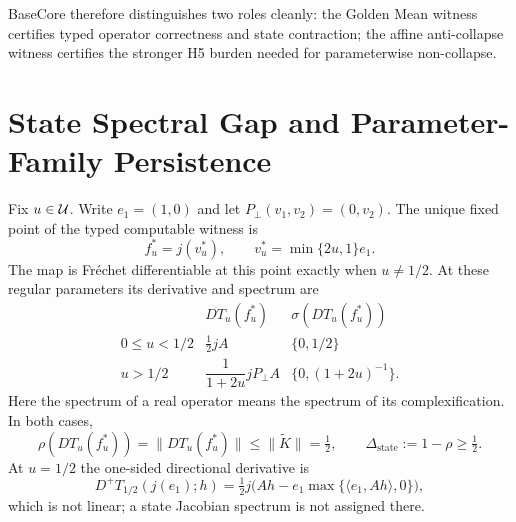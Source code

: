 \begin{remark}
BaseCore therefore distinguishes two roles cleanly: the Golden Mean witness certifies typed operator correctness and state contraction; the affine anti-collapse witness certifies the stronger H5 burden needed for parameterwise non-collapse.
\end{remark}

\section{State Spectral Gap and Parameter-Family Persistence}

\begin{theorem}\label{thm:spectrum}
Fix $u\in\mathcal{U}$. Write $e_1=(1,0)$ and let $P_\perp(v_1,v_2)=(0,v_2)$.
The unique fixed point of the typed computable witness is
\[
 f_u^*=j(v_u^*),\qquad v_u^*=\min\{2u,1\}e_1.
\]
The map is Fr\'echet differentiable at this point exactly when $u\ne1/2$.
At these regular parameters its derivative and spectrum are
\[
\begin{array}{c|c|c}
 &DT_u(f_u^*)&\sigma(DT_u(f_u^*))\\ \hline
0\le u<1/2&\tfrac12 jA&\{0,1/2\}\\[2pt]
u>1/2&\dfrac{1}{1+2u}jP_\perp A&\{0,(1+2u)^{-1}\}.
\end{array}
\]
Here the spectrum of a real operator means the spectrum of its complexification.
In both cases,
\[
 \rho(DT_u(f_u^*))=\|DT_u(f_u^*)\|
 \leq\|\widetilde K\|=\tfrac12,
 \qquad \Delta_{\mathrm{state}}:=1-\rho\geq\tfrac12.
\]
At $u=1/2$ the one-sided directional derivative is
\[
 D^+T_{1/2}(j(e_1);h)
 =\tfrac12j\bigl(Ah-e_1\max\{\langle e_1,Ah\rangle,0\}\bigr),
\]
which is not linear; a state Jacobian spectrum is not assigned there.
\end{theorem}

